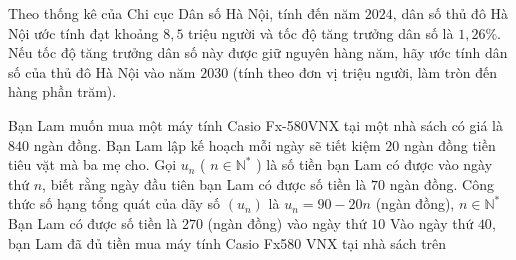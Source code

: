 \begin{bt}%
	Theo thống kê của Chi cục Dân số Hà Nội, tính đến năm $2024$, dân số thủ đô Hà Nội ước tính đạt khoảng $8{,}5$ triệu người và tốc độ tăng trưởng dân số là $1{,}26\%$. Nếu tốc độ tăng trưởng dân số này được giữ nguyên hàng năm, hãy ước tính dân số của thủ đô Hà Nội vào năm $2030$ (tính theo đơn vị triệu người, làm tròn đến hàng phần trăm).
\end{bt}

\begin{ex}%
	Bạn Lam muốn mua một máy tính Casio Fx-580VNX tại một nhà sách có giá là $840$ ngàn đồng. Bạn Lam lập kế hoạch mỗi ngày sẽ tiết kiệm $20$ ngàn đồng tiền tiêu vặt mà ba mẹ cho. Gọi $u_n$ ( $n \in \mathbb{N}^*$ ) là số tiền bạn Lam có được vào ngày thứ $n$, biết rằng ngày đầu tiên bạn Lam có được số tiền là $70$ ngàn đồng.
	{Công thức số hạng tổng quát của dãy số $\left(u_n\right)$ là $u_n=90-20 n$ (ngàn đồng), $n \in \mathbb{N}^*$}
	{Bạn Lam có được số tiền là $270$ (ngàn đồng) vào ngày thứ $10$}
	{\True Vào ngày thứ $40$, bạn Lam đã đủ tiền mua máy tính Casio Fx580 VNX tại nhà sách trên}
\end{ex}

